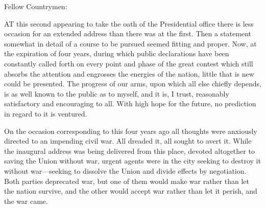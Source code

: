 \documentclass[a4paper]{amsbook}
\begin{document}
\vspace{10 mm}

Fellow Countrymen:

AT this second appearing to take the oath of the Presidential office there is less occasion for an extended address than there was at the first. Then a statement somewhat in detail of a course to be pursued seemed fitting and proper. Now, at the expiration of four years, during which public declarations have been constantly called forth on every point and phase of the great contest which still absorbs the attention and engrosses the energies of the nation, little that is new could be presented. The progress of our arms, upon which all else chiefly depends, is as well known to the public as to myself, and it is, I trust, reasonably satisfactory and encouraging to all. With high hope for the future, no prediction in regard to it is ventured.

On the occasion corresponding to this four years ago all thoughts were anxiously directed to an impending civil war. All dreaded it, all sought to avert it. While the inaugural address was being delivered from this place, devoted altogether to saving the Union without war, urgent agents were in the city seeking to destroy it without war—seeking to dissolve the Union and divide effects by negotiation. Both parties deprecated war, but one of them would make war rather than let the nation survive, and the other would accept war rather than let it perish, and the war came.
\end{document}
